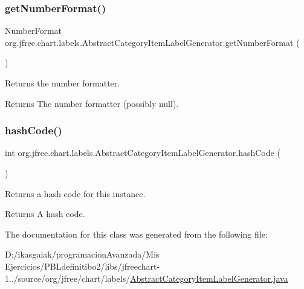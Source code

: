 \subsubsection{\texorpdfstring{get\+Number\+Format()}{getNumberFormat()}}
{\footnotesize\ttfamily Number\+Format org.\+jfree.\+chart.\+labels.\+Abstract\+Category\+Item\+Label\+Generator.\+get\+Number\+Format (\begin{DoxyParamCaption}{ }\end{DoxyParamCaption})}

Returns the number formatter.

\begin{DoxyReturn}{Returns}
The number formatter (possibly {\ttfamily null}). 
\end{DoxyReturn}
\mbox{\label{classorg_1_1jfree_1_1chart_1_1labels_1_1_abstract_category_item_label_generator_aa88f8541867de6d809af00b7eb46941a}} 
\subsubsection{\texorpdfstring{hash\+Code()}{hashCode()}}
{\footnotesize\ttfamily int org.\+jfree.\+chart.\+labels.\+Abstract\+Category\+Item\+Label\+Generator.\+hash\+Code (\begin{DoxyParamCaption}{ }\end{DoxyParamCaption})}

Returns a hash code for this instance.

\begin{DoxyReturn}{Returns}
A hash code. 
\end{DoxyReturn}


The documentation for this class was generated from the following file\+:\begin{DoxyCompactItemize}
\item 
D\+:/ikasgaiak/programacion\+Avanzada/\+Mis Ejercicios/\+P\+B\+Ldefinitibo2/libs/jfreechart-\/1../source/org/jfree/chart/labels/\mbox{\hyperlink{_abstract_category_item_label_generator_8java}{Abstract\+Category\+Item\+Label\+Generator.\+java}}\end{DoxyCompactItemize}
